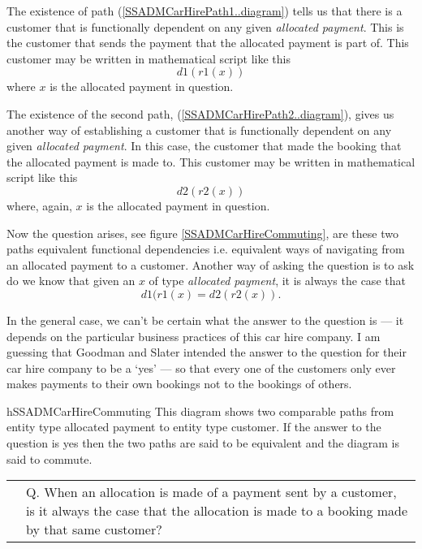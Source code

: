 The existence of path (\ref{SSADMCarHirePath1..diagram}) tells us that
there is a customer that is functionally dependent on any 
given  \textit{allocated payment}. This is the customer that sends the payment that the allocated payment is part of. This customer may be written in mathematical script like this
\begin{equation*}
d1(r1(x))
\end{equation*}
where $x$ is the allocated payment in question. 

The existence of the second path, (\ref{SSADMCarHirePath2..diagram}), gives us another 
way of establishing a customer that is functionally dependent on any 
given  \textit{allocated payment}. In this case, the customer that made the booking
that the allocated payment is made to. This customer may be written in mathematical script like this
\begin{equation*}
d2(r2(x))
\end{equation*}
where, again, $x$ is the allocated payment in question. 

\mynote
Now the question arises, see figure \ref{SSADMCarHireCommuting}, are these two paths equivalent functional dependencies i.e. equivalent ways of navigating from an allocated payment to a customer. 
Another way of asking the question is to ask 
do we know that given an $x$ of type \textit{allocated  payment}, it is always the case that
\begin{equation*}
d1(r1(x) = d2(r2(x)).
\end{equation*}

\mynote
In the general case, we can't be certain what the answer to the question is ---
it depends on the particular business practices of this car hire company. 
I am guessing that Goodman and Slater intended the answer to the question for their car hire company to be a `yes' ---  so that every one of the customers only ever makes payments to their own bookings not to the bookings of others.

\begin{erboxedFigure}{h}{SSADMCarHireCommuting}
{
This diagram  shows two comparable paths from entity type allocated payment to entity type customer. If the answer to the question is yes then  the two paths are said to be equivalent and the diagram is said to commute.}
\begin{tabular}{c  p{5.5cm}}
\raisebox{-2.8cm}{\scalebox{0.9}
{}}
&
Q. When an allocation is made of a payment sent by a customer, is it always the case that
the allocation is made to a booking made by that same customer? \\[0.2cm]
\end{tabular} 
\end{erboxedFigure}

